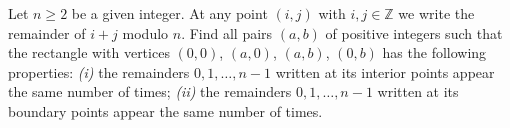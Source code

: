 Let $n \geq 2$ be a given integer. At any point $(i, j)$ with $i, j \in\mathbb{ Z}$ we write the remainder of $i+j$ modulo $n$. Find all pairs $(a, b)$ of positive integers such that the rectangle with vertices $(0, 0)$, $(a, 0)$, $(a, b)$, $(0, b)$ has the following properties:
\textit{(i)} the remainders $0, 1, \ldots , n-1$ written at its interior points appear the same number of times;
\textit{(ii)} the remainders $0, 1, \ldots , n -1$ written at its boundary points appear the same number of times.